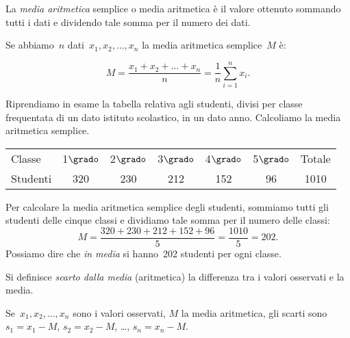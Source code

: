 \begin{definizione}
La \emph{media aritmetica} semplice o media aritmetica è il valore ottenuto 
sommando tutti i dati e
dividendo tale somma per il numero dei dati.
\end{definizione}

Se abbiamo~$n$ dati~$x_1, x_2, \ldots, x_n$ la media aritmetica 
semplice~$M$ è:

\begin{equation*}
M=\frac{x_1+x_2+ \dots +x_n}{n}=\frac{1}{n}\sum_{i=1}^n x_i.
\end{equation*}

\begin{exrig}
 \begin{esempio}

Riprendiamo in esame la tabella relativa agli studenti, divisi per classe 
frequentata di un dato istituto scolastico, in un dato anno. Calcoliamo la 
media aritmetica semplice.
\begin{center}
 \begin{tabular}{lcccccc}
 \toprule
 Classe & 1$\grado$ & 2$\grado$ & 3$\grado$ & 4$\grado$ & 5$\grado$ & 
Totale\\
 Studenti & 320 & 230 & 212 & 152 & 96 & 1010\\
 \bottomrule
\end{tabular}
\end{center}
Per calcolare la media aritmetica semplice degli studenti, sommiamo tutti 
gli studenti delle cinque classi e dividiamo tale somma per il numero delle 
classi:
\begin{equation*}
M=\frac{320+230+212+152+96}{5}= \frac{1010}{5}= 202.
\end{equation*}
Possiamo dire che \emph{in media} si hanno~202 studenti per ogni classe.

\begin{definizione}
Si definisce \emph{scarto dalla media} (aritmetica) la differenza tra i 
valori osservati e la media.
\end{definizione}

Se~$x_1, x_2, \ldots, x_n$ sono i valori osservati, $M$ la media 
aritmetica, gli scarti sono~$s_1=x_1-M$, $s_2=x_2-M$, \ldots, $s_n=x_n-M$.
\end{esempio}


\end{exrig}

